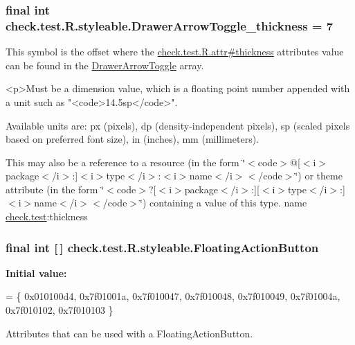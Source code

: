 \subsubsection[{Drawer\+Arrow\+Toggle\+\_\+thickness}]{\setlength{\rightskip}{0pt plus 5cm}final int check.\+test.\+R.\+styleable.\+Drawer\+Arrow\+Toggle\+\_\+thickness = 7\hspace{0.3cm}{\ttfamily [static]}}\label{classcheck_1_1test_1_1_r_1_1styleable_a3245f5a85d7d25f1960c495b486d78e6}
This symbol is the offset where the \hyperlink{classcheck_1_1test_1_1_r_1_1attr_a124aa9eea72db03186b6295aebdcfec8}{check.\+test.\+R.\+attr\#thickness} attribute\textquotesingle{}s value can be found in the \hyperlink{classcheck_1_1test_1_1_r_1_1styleable_a3bd2348d01049d5d42d5b7f277abeec9}{Drawer\+Arrow\+Toggle} array.

\begin{DoxyVerb}      <p>Must be a dimension value, which is a floating point number appended with a unit such as "<code>14.5sp</code>".
\end{DoxyVerb}
 Available units are\+: px (pixels), dp (density-\/independent pixels), sp (scaled pixels based on preferred font size), in (inches), mm (millimeters). 

This may also be a reference to a resource (in the form \char`\"{}$<$code$>$@\mbox{[}$<$i$>$package$<$/i$>$\+:\mbox{]}$<$i$>$type$<$/i$>$\+:$<$i$>$name$<$/i$>$$<$/code$>$\char`\"{}) or theme attribute (in the form \char`\"{}$<$code$>$?\mbox{[}$<$i$>$package$<$/i$>$\+:\mbox{]}\mbox{[}$<$i$>$type$<$/i$>$\+:\mbox{]}$<$i$>$name$<$/i$>$$<$/code$>$\char`\"{}) containing a value of this type.  name \hyperlink{namespacecheck_1_1test}{check.\+test}\+:thickness \hypertarget{classcheck_1_1test_1_1_r_1_1styleable_ae6f501c03537511d2edaad8d699781da}{}
\subsubsection[{Floating\+Action\+Button}]{\setlength{\rightskip}{0pt plus 5cm}final int \mbox{[}$\,$\mbox{]} check.\+test.\+R.\+styleable.\+Floating\+Action\+Button\hspace{0.3cm}{\ttfamily [static]}}\label{classcheck_1_1test_1_1_r_1_1styleable_ae6f501c03537511d2edaad8d699781da}
{\bfseries Initial value\+:}
\begin{DoxyCode}
= \{
            0x010100d4, 0x7f01001a, 0x7f010047, 0x7f010048,
            0x7f010049, 0x7f01004a, 0x7f010102, 0x7f010103
        \}
\end{DoxyCode}
Attributes that can be used with a Floating\+Action\+Button. 

